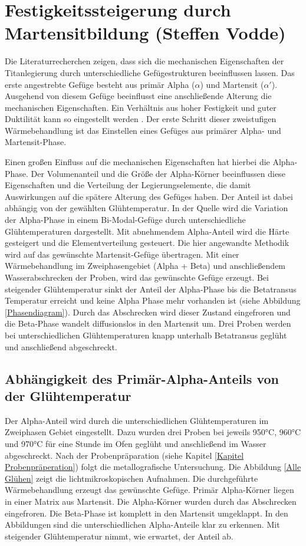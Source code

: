 \documentclass[a4paper, 11pt]{tubsreprt}
\begin{document}
\section{Festigkeitssteigerung durch Martensitbildung (Steffen Vodde)}\label{Festigkeitssteigerung durch Martensitbildung}
Die Literaturrecherchen zeigen, dass sich die mechanischen Eigenschaften der Titanlegierung durch unterschiedliche Gefügestrukturen beeinflussen lassen. Das erste angestrebte Gefüge besteht aus primär Alpha ($\alpha$) und Martensit ($\alpha'$). Ausgehend von diesem Gefüge beeinflusst eine anschließende Alterung die mechanischen Eigenschaften. Ein  Verhältnis aus hoher Festigkeit und guter Duktilität kann so eingestellt werden \cite{Gilbert1990}. Der erste Schritt dieser zweistufigen Wärmebehandlung ist das Einstellen eines Gefüges aus primärer Alpha- und Martensit-Phase.
 
Einen großen Einfluss auf die mechanischen Eigenschaften hat hierbei die Alpha-Phase. Der Volumenanteil und die Größe der Alpha-Körner beeinflussen diese Eigenschaften und die Verteilung der Legierungselemente, die damit Auswirkungen auf die spätere Alterung des Gefüges haben. Der Anteil ist dabei abhängig von der gewählten Glühtemperatur. In der Quelle \cite{Sahoo2015} wird die Variation der Alpha-Phase in einem Bi-Modal-Gefüge durch unterschiedliche Glühtemperaturen dargestellt. Mit abnehmendem Alpha-Anteil wird die Härte gesteigert und die Elementverteilung gesteuert. Die hier angewandte Methodik wird auf das gewünschte Martensit-Gefüge übertragen.
Mit einer Wärmebehandlung im Zweiphasengebiet (Alpha + Beta) und anschließendem Wasserabschrecken der Proben, wird das gewünschte Gefüge erzeugt. Bei steigender Glühtemperatur sinkt der Anteil der Alpha-Phase bis die Betatransus Temperatur erreicht und keine Alpha Phase mehr vorhanden ist (siehe Abbildung \ref{Phasendiagram}).  Durch das Abschrecken wird dieser Zustand eingefroren und die Beta-Phase wandelt diffusionslos in den Martensit um. Drei Proben werden bei unterschiedlichen Glühtemperaturen knapp unterhalb Betatransus geglüht und anschließend abgeschreckt.


\subsection{Abhängigkeit des Primär-Alpha-Anteils von der Glühtemperatur}
Der Alpha-Anteil wird durch die unterschiedlichen Glühtemperaturen im Zweiphasen Gebiet eingestellt. Dazu wurden drei Proben bei jeweils 950°C, 960°C und 970°C für eine Stunde im Ofen geglüht und anschließend im Wasser abgeschreckt. Nach der Probenpräparation (siehe Kapitel \ref{Kapitel Probenpräperation}) folgt die metallografische Untersuchung. Die Abbildung \ref{Alle Glühen} zeigt die lichtmikroskopischen Aufnahmen. Die durchgeführte Wärmebehandlung erzeugt das gewünschte Gefüge. Primär Alpha-Körner liegen in einer Matrix aus Martensit. Die Alpha-Körner wurden durch das Abschrecken eingefroren. Die Beta-Phase ist komplett in den Martensit umgeklappt. In den Abbildungen sind die unterschiedlichen Alpha-Anteile klar zu erkennen. Mit steigender Glühtemperatur nimmt, wie erwartet, der Anteil ab. 
\end{document}
